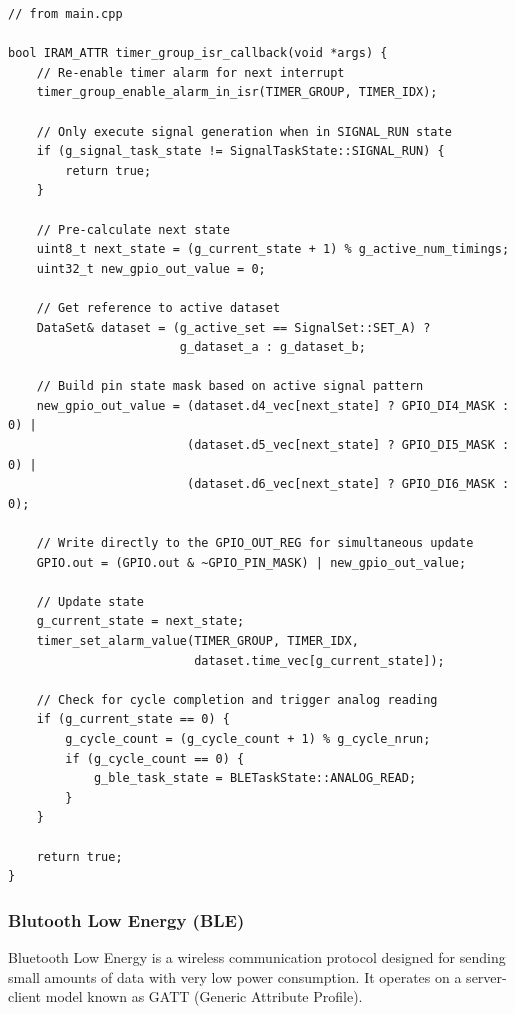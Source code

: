 \begin{lstlisting}[caption={Core ISR logic}]
// from main.cpp

bool IRAM_ATTR timer_group_isr_callback(void *args) {
    // Re-enable timer alarm for next interrupt
    timer_group_enable_alarm_in_isr(TIMER_GROUP, TIMER_IDX);

    // Only execute signal generation when in SIGNAL_RUN state
    if (g_signal_task_state != SignalTaskState::SIGNAL_RUN) {
        return true;
    }

    // Pre-calculate next state
    uint8_t next_state = (g_current_state + 1) % g_active_num_timings;
    uint32_t new_gpio_out_value = 0;

    // Get reference to active dataset
    DataSet& dataset = (g_active_set == SignalSet::SET_A) ? 
                        g_dataset_a : g_dataset_b;

    // Build pin state mask based on active signal pattern
    new_gpio_out_value = (dataset.d4_vec[next_state] ? GPIO_DI4_MASK : 0) |
                         (dataset.d5_vec[next_state] ? GPIO_DI5_MASK : 0) |
                         (dataset.d6_vec[next_state] ? GPIO_DI6_MASK : 0);

    // Write directly to the GPIO_OUT_REG for simultaneous update
    GPIO.out = (GPIO.out & ~GPIO_PIN_MASK) | new_gpio_out_value;

    // Update state
    g_current_state = next_state;
    timer_set_alarm_value(TIMER_GROUP, TIMER_IDX, 
                          dataset.time_vec[g_current_state]);
    
    // Check for cycle completion and trigger analog reading
    if (g_current_state == 0) {
        g_cycle_count = (g_cycle_count + 1) % g_cycle_nrun;
        if (g_cycle_count == 0) {
            g_ble_task_state = BLETaskState::ANALOG_READ;
        }
    }

    return true;
}
\end{lstlisting}

\subsubsection{Blutooth Low Energy (BLE)}
Bluetooth Low Energy is a wireless communication protocol designed for sending small amounts of data with very low power
consumption. It operates on a server-client model known as GATT (Generic Attribute Profile).

